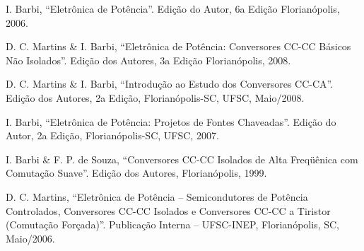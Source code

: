 \documentclass[
	article,			%
	12pt,				%
	twoside,			%
	a4paper,			%
	english,			%
	brazil,				%
	sumario=tradicional
]{abntex2-modelo-plano-de-aula}
\begin{document}
\pagestyle{plain}
\begin{thebibliography}{}
	
	 I. Barbi, “Eletrônica de Potência”. Edição do Autor, 6a Edição Florianópolis,
	2006.
	
	 D. C. Martins \& I. Barbi, “Eletrônica de Potência: Conversores CC-CC Básicos Não Isolados”. Edição dos Autores, 3a Edição Florianópolis, 2008.
	
		D. C. Martins \& I. Barbi, “Introdução ao Estudo dos Conversores CC-CA”. Edição dos Autores, 2a Edição, Florianópolis-SC, UFSC, Maio/2008.
	
	 I. Barbi, “Eletrônica de Potência: Projetos de Fontes Chaveadas”. Edição do
	Autor, 2a Edição, Florianópolis-SC, UFSC, 2007.
	
		I. Barbi \& F. P. de Souza, “Conversores CC-CC Isolados de Alta Freqüênica com Comutação Suave”. Edição dos Autores, Florianópolis, 1999.
	
		D. C. Martins, “Eletrônica de Potência – Semicondutores de Potência
	Controlados, Conversores CC-CC Isolados e Conversores CC-CC a Tiristor
	(Comutação Forçada)”. Publicação Interna – UFSC-INEP, Florianópolis, SC,
	Maio/2006.
	
\end{thebibliography}






\end{document}
